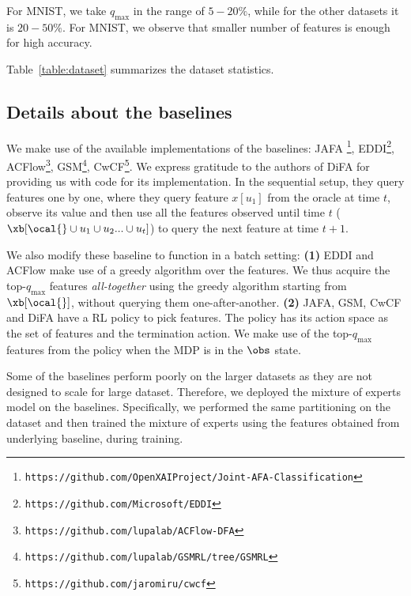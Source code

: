 \documentclass[letterpaper]{article}
\begin{document}
For MNIST, we take $q_{\max}$ in the range of $5-20 \%$, while for the other datasets it is $20-50 \%$. For MNIST, we observe that smaller number of features is enough for high accuracy.

Table~\ref{table:dataset} summarizes the dataset statistics.

\subsection{Details about the baselines}
We make use of the available implementations of the baselines: JAFA \footnote{\scriptsize \texttt{https://github.com/OpenXAIProject/Joint-AFA-Classification}}, EDDI\footnote{\scriptsize \texttt{https://github.com/Microsoft/EDDI}}, ACFlow\footnote{\scriptsize \texttt{https://github.com/lupalab/ACFlow-DFA}}, GSM\footnote{\scriptsize \texttt{https://github.com/lupalab/GSMRL/tree/GSMRL}}, CwCF\footnote{\scriptsize \texttt{https://github.com/jaromiru/cwcf}}. We express gratitude to the authors of DiFA for providing us with code for its implementation. In the sequential setup, they query features one by one, where they query feature $x[u_1]$ from the oracle at time $t$, observe its value and then use all the features observed until time $t$ ($\xb[\ocal{} \cup u_1\cup u_2...\cup u_t]$) to query the next feature at time $t+1$.

We also modify these baseline to function in a batch setting: \textbf{(1)} EDDI and ACFlow make use of a greedy algorithm over the features. We thus acquire the top-$q_{\max}$ features \emph{all-together} using the greedy algorithm starting from $\xb[\ocal{}]$, without querying them one-after-another.  \textbf{(2)} JAFA, GSM, CwCF and DiFA have a RL policy to pick features. The policy has its action space as the set of features and the termination action. We make use of the top-$q_{\max}$ features from the policy when the MDP is in the $\obs$ state.
%

Some of the baselines perform poorly on the larger datasets as they are not designed to scale for large dataset. Therefore, we deployed the mixture of experts model on the baselines. Specifically, we performed the same  partitioning on the dataset and then trained the mixture of experts using the features obtained from underlying baseline, during training.
\end{document}
